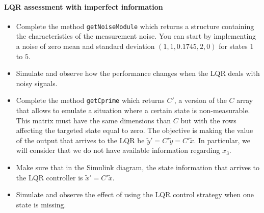 	\paragraph{LQR assessment with imperfect information}
	\begin{itemize}
		\item Complete the method \texttt{getNoiseModule} which returns a structure containing the characteristics of the measurement noise. 
			You can start by implementing a noise of zero mean and standard deviation $(1, 1, 0.1745, 2, 0)$ for states $1$ to $5$. 
		\item Simulate and observe how the performance changes when the LQR deals with noisy signals.  
		\item Complete the method \texttt{getCprime} which returns $C'$, a version of the $C$ array that allows to emulate a situation where a certain state is non-measurable. 
		This matrix must have the same dimensions than $C$ but with the rows affecting the targeted state equal to zero. 
		The objective is making the value of the output that arrives to the LQR be $\tilde{y}' = C' \tilde{y} = C' \tilde{x}$. 
		In particular, we will consider that we do not have available information regarding $x_3$. 
		\item Make sure that in the Simulink diagram, the state information that arrives to the LQR controller is $\tilde{x}' = C' \tilde{x}$.
		\item Simulate and observe the effect of using the LQR control strategy when one state is missing. 
	\end{itemize}
